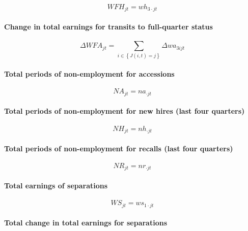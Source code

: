 \begin{equation}
WFH_{jt}=wh_{3\cdot jt}
\end{equation}

\paragraph{Change in total earnings for transits to full-quarter status}

\begin{equation}
\Delta WFA_{jt} = \sum\limits_{i \in \left\{ {J(i,t) = j} \right\}} {\Delta
wa_{3ijt} }
\end{equation}

\paragraph{Total periods of non-employment for accessions}

\begin{equation}
NA_{jt} = na_{\cdot jt}
\end{equation}

\paragraph{Total periods of non-employment for new hires (last four quarters)%
}

\begin{equation}
NH_{jt} = nh_{\cdot jt}
\end{equation}

\paragraph{Total periods of non-employment for recalls (last four quarters)}

\begin{equation}
NR_{jt} = nr_{\cdot jt}
\end{equation}

\paragraph{Total earnings of separations}

\begin{equation}
WS_{jt}=ws_{1\cdot jt}
\end{equation}

\paragraph{Total change in total earnings for separations}

